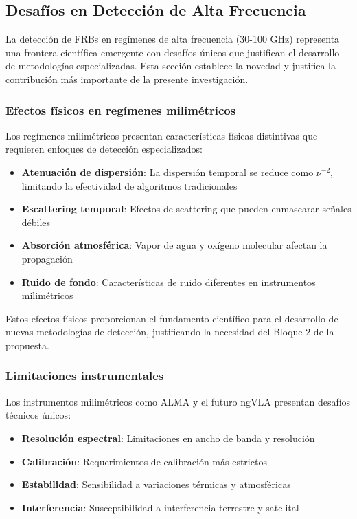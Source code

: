 \subsection{Desafíos en Detección de Alta Frecuencia}

La detección de FRBs en regímenes de alta frecuencia (30-100 GHz) representa una frontera científica emergente con desafíos únicos que justifican el desarrollo de metodologías especializadas. Esta sección establece la novedad y justifica la contribución más importante de la presente investigación.

\subsubsection{Efectos físicos en regímenes milimétricos}

Los regímenes milimétricos presentan características físicas distintivas que requieren enfoques de detección especializados:

\begin{itemize}
    \item \textbf{Atenuación de dispersión}: La dispersión temporal se reduce como $\nu^{-2}$, limitando la efectividad de algoritmos tradicionales
    \item \textbf{Escattering temporal}: Efectos de scattering que pueden enmascarar señales débiles
    \item \textbf{Absorción atmosférica}: Vapor de agua y oxígeno molecular afectan la propagación
    \item \textbf{Ruido de fondo}: Características de ruido diferentes en instrumentos milimétricos
\end{itemize}

Estos efectos físicos proporcionan el fundamento científico para el desarrollo de nuevas metodologías de detección, justificando la necesidad del Bloque 2 de la propuesta.

\subsubsection{Limitaciones instrumentales}

Los instrumentos milimétricos como ALMA y el futuro ngVLA presentan desafíos técnicos únicos:

\begin{itemize}
    \item \textbf{Resolución espectral}: Limitaciones en ancho de banda y resolución
    \item \textbf{Calibración}: Requerimientos de calibración más estrictos
    \item \textbf{Estabilidad}: Sensibilidad a variaciones térmicas y atmosféricas
    \item \textbf{Interferencia}: Susceptibilidad a interferencia terrestre y satelital
\end{itemize}

